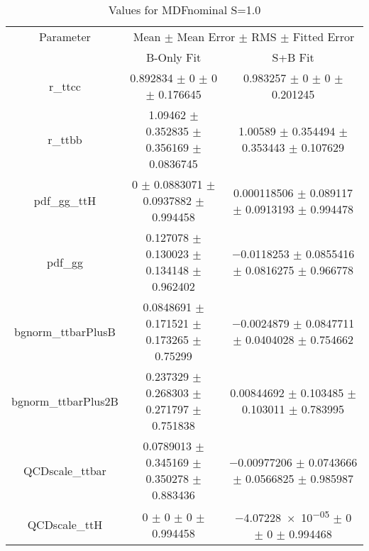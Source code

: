 \begin{table}
\centering
\caption{Values for MDFnominal S=1.0}
\begin{tabular}{ccc}
\toprule
Parameter & \multicolumn{2}{c}{Mean $\pm$ Mean Error $\pm$ RMS $\pm$ Fitted Error}\\
 & B-Only Fit & S+B Fit\\
\midrule
r\_ttcc & \num{0.892834} $\pm$ \num{0} $\pm$ \num{0} $\pm$ \num{0.176645} & \num{0.983257} $\pm$ \num{0} $\pm$ \num{0} $\pm$ \num{0.201245}\\
r\_ttbb & \num{1.09462} $\pm$ \num{0.352835} $\pm$ \num{0.356169} $\pm$ \num{0.0836745} & \num{1.00589} $\pm$ \num{0.354494} $\pm$ \num{0.353443} $\pm$ \num{0.107629}\\
pdf\_gg\_ttH & \num{0} $\pm$ \num{0.0883071} $\pm$ \num{0.0937882} $\pm$ \num{0.994458} & \num{0.000118506} $\pm$ \num{0.089117} $\pm$ \num{0.0913193} $\pm$ \num{0.994478}\\
pdf\_gg & \num{0.127078} $\pm$ \num{0.130023} $\pm$ \num{0.134148} $\pm$ \num{0.962402} & \num{-0.0118253} $\pm$ \num{0.0855416} $\pm$ \num{0.0816275} $\pm$ \num{0.966778}\\
bgnorm\_ttbarPlusB & \num{0.0848691} $\pm$ \num{0.171521} $\pm$ \num{0.173265} $\pm$ \num{0.75299} & \num{-0.0024879} $\pm$ \num{0.0847711} $\pm$ \num{0.0404028} $\pm$ \num{0.754662}\\
bgnorm\_ttbarPlus2B & \num{0.237329} $\pm$ \num{0.268303} $\pm$ \num{0.271797} $\pm$ \num{0.751838} & \num{0.00844692} $\pm$ \num{0.103485} $\pm$ \num{0.103011} $\pm$ \num{0.783995}\\
QCDscale\_ttbar & \num{0.0789013} $\pm$ \num{0.345169} $\pm$ \num{0.350278} $\pm$ \num{0.883436} & \num{-0.00977206} $\pm$ \num{0.0743666} $\pm$ \num{0.0566825} $\pm$ \num{0.985987}\\
QCDscale\_ttH & \num{0} $\pm$ \num{0} $\pm$ \num{0} $\pm$ \num{0.994458} & \num{-4.07228e-05} $\pm$ \num{0} $\pm$ \num{0} $\pm$ \num{0.994468}\\
\bottomrule
\end{tabular}
\end{table}